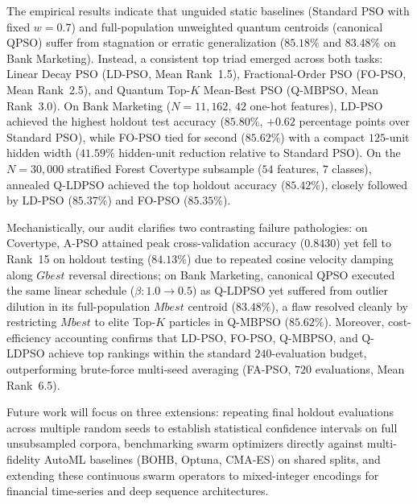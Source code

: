 \documentclass[10pt]{article}
\begin{document}
The empirical results indicate that unguided static baselines (Standard PSO with fixed $w=0.7$) and full-population unweighted quantum centroids (canonical QPSO) suffer from stagnation or erratic generalization ($85.18\%$ and $83.48\%$ on Bank Marketing). Instead, a consistent top triad emerged across both tasks: Linear Decay PSO (LD-PSO, Mean Rank~1.5), Fractional-Order PSO (FO-PSO, Mean Rank~2.5), and Quantum Top-$K$ Mean-Best PSO (Q-MBPSO, Mean Rank~3.0). On Bank Marketing ($N=11{,}162$, $42$ one-hot features), LD-PSO achieved the highest holdout test accuracy ($85.80\%$, $+0.62$ percentage points over Standard PSO), while FO-PSO tied for second ($85.62\%$) with a compact $125$-unit hidden width ($41.59\%$ hidden-unit reduction relative to Standard PSO). On the $N=30{,}000$ stratified Forest Covertype subsample ($54$ features, $7$ classes), annealed Q-LDPSO achieved the top holdout accuracy ($85.42\%$), closely followed by LD-PSO ($85.37\%$) and FO-PSO ($85.35\%$).

Mechanistically, our audit clarifies two contrasting failure pathologies: on Covertype, A-PSO attained peak cross-validation accuracy ($0.8430$) yet fell to Rank~15 on holdout testing ($84.13\%$) due to repeated cosine velocity damping along $Gbest$ reversal directions; on Bank Marketing, canonical QPSO executed the same linear schedule ($\beta: 1.0 \to 0.5$) as Q-LDPSO yet suffered from outlier dilution in its full-population $Mbest$ centroid ($83.48\%$), a flaw resolved cleanly by restricting $Mbest$ to elite Top-$K$ particles in Q-MBPSO ($85.62\%$). Moreover, cost-efficiency accounting confirms that LD-PSO, FO-PSO, Q-MBPSO, and Q-LDPSO achieve top rankings within the standard $240$-evaluation budget, outperforming brute-force multi-seed averaging (FA-PSO, $720$ evaluations, Mean Rank~6.5).

Future work will focus on three extensions: repeating final holdout evaluations across multiple random seeds to establish statistical confidence intervals on full unsubsampled corpora, benchmarking swarm optimizers directly against multi-fidelity AutoML baselines (BOHB, Optuna, CMA-ES) on shared splits, and extending these continuous swarm operators to mixed-integer encodings for financial time-series and deep sequence architectures.
\end{document}
